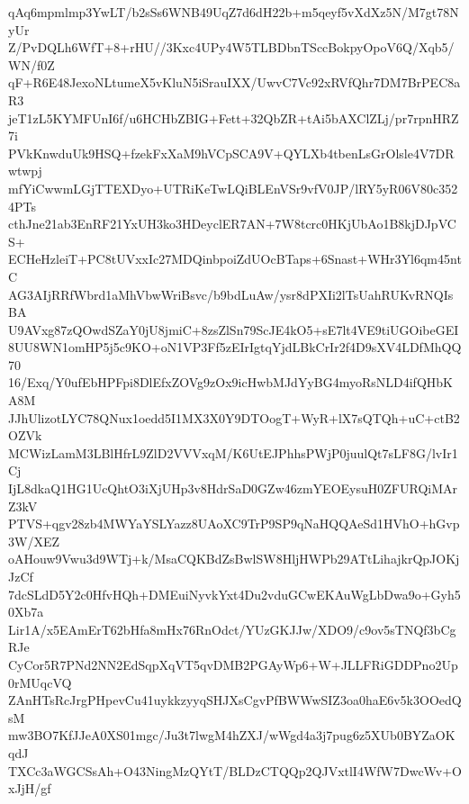 qAq6mpmlmp3YwLT/b2sSs6WNB49UqZ7d6dH22b+m5qeyf5vXdXz5N/M7gt78NyUr
Z/PvDQLh6WfT+8+rHU//3Kxc4UPy4W5TLBDbnTSccBokpyOpoV6Q/Xqb5/WN/f0Z
qF+R6E48JexoNLtumeX5vKluN5iSrauIXX/UwvC7Vc92xRVfQhr7DM7BrPEC8aR3
jeT1zL5KYMFUnI6f/u6HCHbZBIG+Fett+32QbZR+tAi5bAXClZLj/pr7rpnHRZ7i
PVkKnwduUk9HSQ+fzekFxXaM9hVCpSCA9V+QYLXb4tbenLsGrOlsle4V7DRwtwpj
mfYiCwwmLGjTTEXDyo+UTRiKeTwLQiBLEnVSr9vfV0JP/lRY5yR06V80c3524PTs
cthJne21ab3EnRF21YxUH3ko3HDeyclER7AN+7W8tcrc0HKjUbAo1B8kjDJpVCS+
ECHeHzleiT+PC8tUVxxIc27MDQinbpoiZdUOcBTaps+6Snast+WHr3Yl6qm45ntC
AG3AIjRRfWbrd1aMhVbwWriBsvc/b9bdLuAw/ysr8dPXIi2lTsUahRUKvRNQIsBA
U9AVxg87zQOwdSZaY0jU8jmiC+8zsZlSn79ScJE4kO5+sE7lt4VE9tiUGOibeGEI
8UU8WN1omHP5j5c9KO+oN1VP3Ff5zEIrIgtqYjdLBkCrIr2f4D9sXV4LDfMhQQ70
16/Exq/Y0ufEbHPFpi8DlEfxZOVg9zOx9icHwbMJdYyBG4myoRsNLD4ifQHbKA8M
JJhUlizotLYC78QNux1oedd5I1MX3X0Y9DTOogT+WyR+lX7sQTQh+uC+ctB2OZVk
MCWizLamM3LBlHfrL9ZlD2VVVxqM/K6UtEJPhhsPWjP0juulQt7sLF8G/lvIr1Cj
IjL8dkaQ1HG1UcQhtO3iXjUHp3v8HdrSaD0GZw46zmYEOEysuH0ZFURQiMArZ3kV
PTVS+qgv28zb4MWYaYSLYazz8UAoXC9TrP9SP9qNaHQQAeSd1HVhO+hGvp3W/XEZ
oAHouw9Vwu3d9WTj+k/MsaCQKBdZsBwlSW8HljHWPb29ATtLihajkrQpJOKjJzCf
7dcSLdD5Y2c0HfvHQh+DMEuiNyvkYxt4Du2vduGCwEKAuWgLbDwa9o+Gyh50Xb7a
Lir1A/x5EAmErT62bHfa8mHx76RnOdct/YUzGKJJw/XDO9/c9ov5sTNQf3bCgRJe
CyCor5R7PNd2NN2EdSqpXqVT5qvDMB2PGAyWp6+W+JLLFRiGDDPno2Up0rMUqcVQ
ZAnHTsRcJrgPHpevCu41uykkzyyqSHJXsCgvPfBWWwSIZ3oa0haE6v5k3OOedQsM
mw3BO7KfJJeA0XS01mgc/Ju3t7lwgM4hZXJ/wWgd4a3j7pug6z5XUb0BYZaOKqdJ
TXCc3aWGCSsAh+O43NingMzQYtT/BLDzCTQQp2QJVxtlI4WfW7DwcWv+OxJjH/gf

